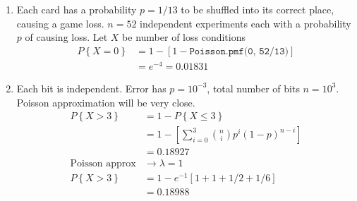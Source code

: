 \begin{enumerate}
\begin{subequations}
\begin{enumerate}
			\item Since the binomial exact expression is difficult to compute, switch to Poisson approximation with $ \lambda = p $\\
			\begin{align}
				P \left\{Y \geq 1\right\} &= 1 - (e^{-p})^n \nonumber \\
				&= 1 \qquad \text{within computation errors}
			\end{align}
			
		\end{enumerate}
	\end{subequations} 

	\item Each card has a probability $ p = 1/13 $ to be shuffled into its correct place, causing a game loss. $ n = 52 $ independent experiments each with a probability $ p $ of causing loss. Let $ X $ be number of loss conditions \\
	\begin{subequations}
		\begin{align}
			P \left\{X = 0 \right\} &= 1 - [1 - \texttt{Poisson.pmf(0, 52/13)}] \nonumber \\
			&= e^{-4} = 0.01831
		\end{align}
	\end{subequations} 

	\item Each bit is independent. Error has $ p = 10^{-3} $, total number of bits $ n = 10^3 $. Poisson approximation will be very close.
	\begin{subequations}
		\begin{align}
			P \left\{X > 3 \right\} &= 1 - P \left\{X \leq 3 \right\} \nonumber \\
			&= 1 - \left[\sum\limits_{i = 0}^{3} \binom{n}{i} p^i (1-p)^{n-i}\right] \nonumber \\
			&= 0.18927 \\
			\text{Poisson approx} &\to \lambda = 1 \\
			P \left\{X > 3 \right\} &= 	1 - e^{-1}\left[1 + 1 + 1/2 + 1/6 \right] \nonumber \\
			&= 0.18988
		\end{align}
	\end{subequations} 


\end{enumerate}
